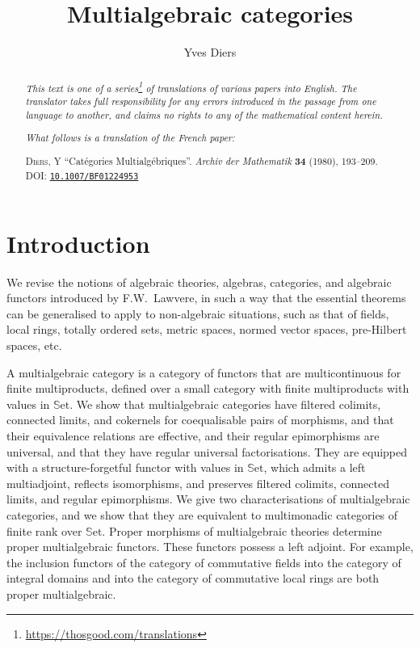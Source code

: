 \documentclass{article}
\title{Multialgebraic categories}
\author{Yves Diers}
\date{}
\newcommand{\doctype}{French paper}
\newcommand{\origcit}{%
  \textsc{Diers, Y}
  ``Cat\'{e}gories Multialg\'{e}briques''.
  \emph{Archiv der Mathematik} \textbf{34} (1980), 193--209.
  DOI: \href{https://doi.org/10.1007/BF01224953}{\texttt{10.1007/BF01224953}}%
}
\newcommand{\Set}{\mathbb{S}\mathrm{et}}
\newcommand{\oldpage}[1]{\marginpar{\footnotesize$\Big\vert$ \textit{p.~#1}}}
\begin{document}
\maketitle
\thispagestyle{fancy}

\renewcommand{\abstractname}{Translator's note.}

\begin{abstract}
  \renewcommand*{\thefootnote}{\fnsymbol{footnote}}
  \emph{This text is one of a series\footnote{\url{https://thosgood.com/translations}} of translations of various papers into English.}
  \emph{The translator takes full responsibility for any errors introduced in the passage from one language to another, and claims no rights to any of the mathematical content herein.}

  \medskip
  
  \emph{What follows is a translation of the \doctype:}

  \medskip\noindent
  \origcit
\end{abstract}

\setcounter{footnote}{0}
\setcounter{section}{-1}

\setcounter{tocdepth}{1}
\tableofcontents
\bigskip



\section{Introduction}
\label{0}

\oldpage{193}
We revise the notions of algebraic theories, algebras, categories, and algebraic functors introduced by F.W.~Lawvere, in such a way that the essential theorems can be generalised to apply to non-algebraic situations, such as that of fields, local rings, totally ordered sets, metric spaces, normed vector spaces, pre-Hilbert spaces, etc.

A multialgebraic category is a category of functors that are multicontinuous for finite multiproducts, defined over a small category with finite multiproducts with values in $\Set$.
We show that multialgebraic categories have filtered colimits, connected limits, and cokernels for coequalisable pairs of morphisms, and that their equivalence relations are effective, and their regular epimorphisms are universal, and that they have regular universal factorisations.
They are equipped with a structure-forgetful functor with values in $\Set$, which admits a left multiadjoint, reflects isomorphisms, and preserves filtered colimits, connected limits, and regular epimorphisms.
We give two characterisations of multialgebraic categories, and we show that they are equivalent to multimonadic categories of finite rank over $\Set$.
Proper morphisms of multialgebraic theories determine proper multialgebraic functors.
These functors possess a left adjoint.
For example, the inclusion functors of the category of commutative fields into the category of integral domains and into the category of commutative local rings are both proper multialgebraic.
\end{document}
